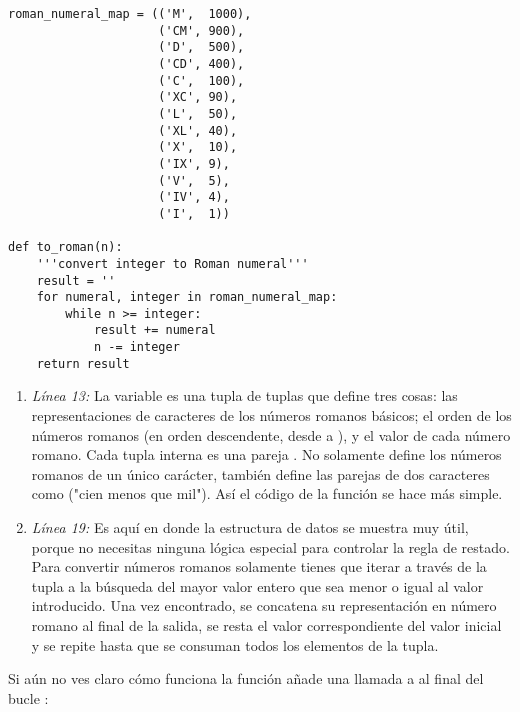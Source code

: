 \noindent\begin{minipage}{\textwidth}
\begin{lstlisting}[mathescape=True]
roman_numeral_map = (('M',  1000),
                     ('CM', 900),
                     ('D',  500),
                     ('CD', 400),
                     ('C',  100),
                     ('XC', 90),
                     ('L',  50),
                     ('XL', 40),
                     ('X',  10),
                     ('IX', 9),
                     ('V',  5),
                     ('IV', 4),
                     ('I',  1))

def to_roman(n):
    '''convert integer to Roman numeral'''
    result = ''
    for numeral, integer in roman_numeral_map:
        while n >= integer:
            result += numeral
            n -= integer
    return result
\end{lstlisting}
\end{minipage}

\begin{enumerate}

\item \emph{Línea 13:} La variable  es una tupla de tuplas que define tres cosas: las representaciones de caracteres de los números romanos básicos; el orden de los números romanos (en orden descendente, desde  a ), y el valor de cada número romano. Cada tupla interna es una pareja . No solamente define los números romanos de un único carácter, también define las parejas de dos caracteres como  ("cien menos que mil"). Así el código de la función  se hace más simple.

\item \emph{Línea 19:} Es aquí en donde la estructura de datos  se muestra muy útil, porque no necesitas ninguna lógica especial para controlar la regla de restado. Para convertir números romanos solamente tienes que iterar a través de la tupla  a la búsqueda del mayor valor entero que sea menor o igual al valor introducido. Una vez encontrado, se concatena su representación en número romano al final de la salida, se resta el valor correspondiente del valor inicial y se repite hasta que se consuman todos los elementos de la tupla.

\end{enumerate}

Si aún no ves claro cómo funciona la función  añade una llamada a  al final del bucle :

